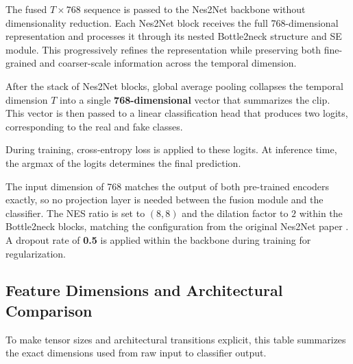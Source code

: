 \documentclass[11pt,a4paper]{article}
\begin{document}
The fused $T\times768$ sequence is passed to the Nes2Net backbone without
dimensionality reduction. Each Nes2Net block receives the full 768-dimensional
representation and processes it through its nested Bottle2neck structure and SE
module. This progressively refines the representation while preserving both
fine-grained and coarser-scale information across the temporal dimension.

After the stack of Nes2Net blocks, global average pooling collapses the temporal
dimension $T$ into a single \textbf{768-dimensional} vector that summarizes the
clip. This vector is then passed to a linear classification head that produces two
logits, corresponding to the real and fake classes.

During training, cross-entropy loss is applied to these logits. At inference time,
the argmax of the logits determines the final prediction.

The input dimension of 768 matches the output of both pre-trained encoders
exactly, so no projection layer is needed between the fusion module and the
classifier. The NES ratio is set to $(8, 8)$ and the dilation factor to $2$ within
the Bottle2neck blocks, matching the configuration from the original Nes2Net paper
\cite{liu2025nes2net}. A dropout rate of \textbf{0.5} is applied within the
backbone during training for regularization.

\subsection{Feature Dimensions and Architectural Comparison}

To make tensor sizes and architectural transitions explicit, this table summarizes
the exact dimensions used from raw input to classifier output.
\end{document}
